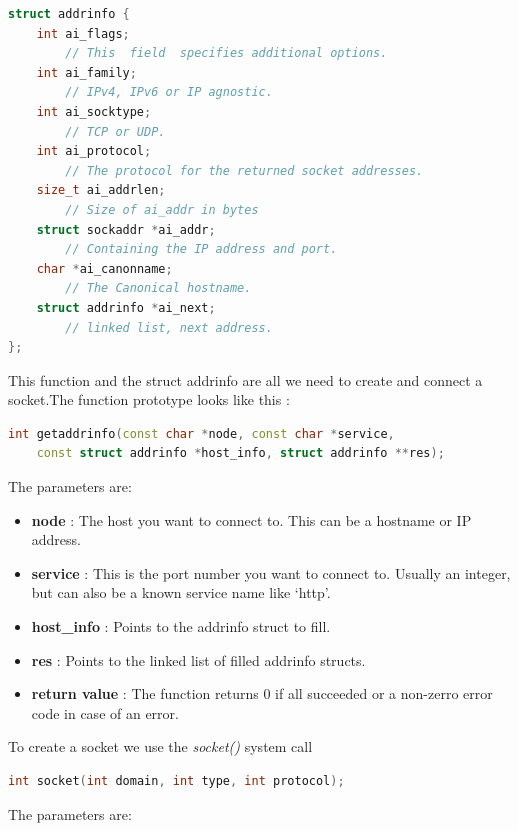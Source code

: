 \documentclass{article}
\begin{document}
				\begin{lstlisting}[language=C++, caption={The structure ``addrinfo''}]
struct addrinfo {
    int ai_flags;     
    	// This  field  specifies additional options.
    int ai_family;    
    	// IPv4, IPv6 or IP agnostic.
    int ai_socktype;  
    	// TCP or UDP.
    int ai_protocol;  
    	// The protocol for the returned socket addresses.
    size_t ai_addrlen;   
    	// Size of ai_addr in bytes
    struct sockaddr *ai_addr;      
    	// Containing the IP address and port.
    char *ai_canonname; 
    	// The Canonical hostname.
    struct addrinfo *ai_next;      
    	// linked list, next address.
};
				\end{lstlisting}

				This function and the struct addrinfo are all we need to create and connect a socket.The function prototype looks like this : 

				\begin{lstlisting}[language=C++, caption={getaddrinfo() function}]
int getaddrinfo(const char *node, const char *service,
	const struct addrinfo *host_info, struct addrinfo **res); 
				\end{lstlisting}

				The parameters are:

				\begin{itemize}
					\item \textbf{node} : The host you want to connect to. This can be a hostname or IP address. 
					\item \textbf{service} : This is the port number you want to connect to. Usually an integer, but can also be a known service name like `http'. 					
					\item \textbf{host\_info} : Points to the addrinfo struct to fill. 					
					\item \textbf{res} : Points to the linked list of filled addrinfo structs. 
					\item \textbf{return value} : The function returns 0 if all succeeded or a non-zerro error code in case of an error.  
				\end{itemize}
				
				To create a socket we use the \textit{socket()} system call 

				\begin{lstlisting}[language=C++, caption={socket() function}]
int socket(int domain, int type, int protocol); 
				\end{lstlisting} 	

				The parameters are:
\end{document}
